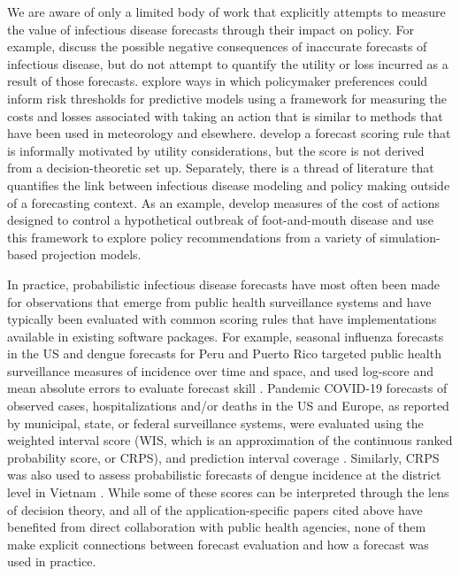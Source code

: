 \documentclass{article}\usepackage[]{graphicx}\usepackage[]{xcolor}
\begin{document}
We are aware of only a limited body of work that explicitly attempts to measure the value of infectious disease forecasts through their impact on policy. For example, \cite{ioannidis2022forecastingCOVIDfailed} discuss the possible negative consequences of inaccurate forecasts of infectious disease, but do not attempt to quantify the utility or loss incurred as a result of those forecasts. \cite{bilinski_adaptive_2023} explore ways in which policymaker preferences could inform risk thresholds for predictive models using a framework for measuring the costs and losses associated with taking an action that is similar to methods that have been used in meteorology and elsewhere. \cite{marshall2023predictions} develop a forecast scoring rule that is informally motivated by utility considerations, but the score is not derived from a decision-theoretic set up. Separately, there is a thread of literature that quantifies the link between infectious disease modeling and policy making outside of a forecasting context. As an example, \cite{Probert2016decisionMakingFootMouth} develop measures of the cost of actions designed to control a hypothetical outbreak of foot-and-mouth disease and use this framework to explore policy recommendations from a variety of simulation-based projection models.

In practice, probabilistic infectious disease forecasts have most often been made for observations that emerge from public health surveillance systems and have typically been evaluated with common scoring rules that have implementations available in existing software packages.
For example, seasonal influenza forecasts in the US and dengue forecasts for Peru and Puerto Rico targeted public health surveillance measures of incidence over time and space, and used log-score and mean absolute errors to evaluate forecast skill \citep{mcgowan_collaborative_2019,reich_collaborative_2019,johansson_open_2019}.
Pandemic COVID-19 forecasts of observed cases, hospitalizations and/or deaths in the US and Europe, as reported by municipal, state, or federal surveillance systems, were evaluated using the weighted interval score (WIS, which is an approximation of the continuous ranked probability score, or CRPS), and prediction interval coverage \citep{cramer_evaluation_2022,fox_real-time_2022,sherratt2023predictive}.
Similarly, CRPS was also used to assess probabilistic forecasts of dengue incidence at the district level in Vietnam \citep{colon-gonzalez_probabilistic_2021}.
While some of these scores can be interpreted through the lens of decision theory, and all of the application-specific papers cited above have benefited from direct collaboration with public health agencies, none of them make explicit connections between forecast evaluation and how a forecast was used in practice.
\end{document}
